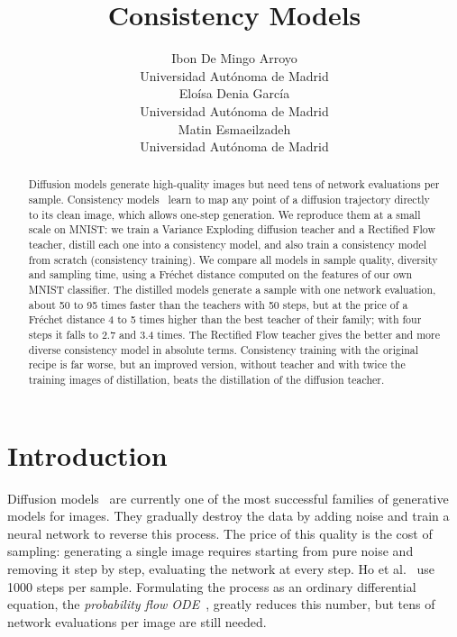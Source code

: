 \documentclass{article}
\title{Consistency Models}
\author{
Ibon De Mingo Arroyo \\
Universidad Autónoma de Madrid \\
\And
Eloísa Denia García \\
Universidad Autónoma de Madrid \\
\And
Matin Esmaeilzadeh \\
Universidad Autónoma de Madrid \\
}
\begin{document}
\maketitle

\begin{abstract}
Diffusion models generate high-quality images but need tens of network
evaluations per sample. Consistency models~\cite{song2023consistency} learn to
map any point of a diffusion trajectory directly to its clean image, which
allows one-step generation. We reproduce them at a small scale on MNIST: we
train a Variance Exploding diffusion teacher and a Rectified Flow teacher,
distill each one into a consistency model, and also train a consistency model
from scratch (consistency training). We compare all models in sample quality,
diversity and sampling time, using a Fréchet distance computed on the
features of our own MNIST classifier. The distilled models generate a sample
with one network evaluation, about 50 to 95 times faster than the teachers
with 50 steps, but at the price of a Fréchet distance 4 to 5 times higher than
the best teacher of their family; with four steps it falls to 2.7 and 3.4 times. The Rectified
Flow teacher gives the better and more diverse consistency model in absolute
terms. Consistency training with the original recipe is far worse, but an
improved version, without teacher and with twice the training images of
distillation, beats the distillation of the diffusion teacher.
\end{abstract}

\section{Introduction}
\label{sec:introduction}

Diffusion models~\cite{ho2020ddpm,song2021sde} are currently one of the most
successful families of generative models for images. They gradually destroy
the data by adding noise and train a neural network to reverse this process.
The price of this quality is the cost of sampling: generating a single image
requires starting from pure noise and removing it step by step, evaluating
the network at every step. Ho et al.~\cite{ho2020ddpm} use 1000 steps per
sample. Formulating the process as an ordinary differential equation, the
\emph{probability flow ODE}~\cite{song2021sde}, greatly reduces this number,
but tens of network evaluations per image are still needed.
\end{document}
